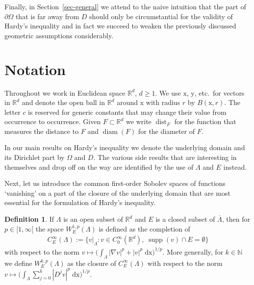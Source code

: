\documentclass[10pt,leqno]{amsart}
\theoremstyle{definition}
\newtheorem{definition}[theorem]{Definition}
\numberwithin{equation}{section}
\begin{document}
Finally, in Section~\ref{sec-general} we attend to the naive intuition that
the part of $\partial \Omega$ that is far away from $D$ should only be
circumstantial for the validity of Hardy's inequality and in fact we succeed to
weaken the previously discussed geometric assumptions considerably.

\section{Notation}
\noindent Throughout we work in Euclidean space ${{\mathbb R}}^d$, $d \geq 1$. We use
${{\mathrm x}}$, ${{\mathrm y}}$, etc.\ for vectors in ${{\mathbb R}}^d$ and denote the open ball in ${{\mathbb R}}^d$
around ${{\mathrm x}}$ with radius $r$ by $B({{\mathrm x}}, r)$. The letter $c$ is reserved for
generic constants that may change their value from occurrence to
occurrence. Given $F \subset {{\mathbb R}}^d$ we write ${\operatorname{dist}}_F$ for the function that
measures the distance to $F$ and ${\operatorname{diam}}(F)$ for the diameter of $F$.

In our main results on Hardy's inequality we denote the underlying domain and
its Dirichlet part by $\Omega$ and $D$. The various side results that are
interesting in themselves and drop off on the way are identified by the use of
$\Lambda$ and $E$ instead.

Next, let us introduce the common first-order Sobolev spaces of functions
`vanishing' on a part of the closure of the underlying domain that are most
essential for the formulation of Hardy's inequality. 

\begin{definition}\label{d-WkpD}
If $\Lambda$ is an open subset of ${{\mathbb R}}^d$ and $E$ is a closed subset of
$\overline \Lambda$, then for $p \in {[1,\infty[}$ the space
$W^{1,p}_E(\Lambda)$ is defined as the completion of
 \begin{align*}
   C^\infty_E(\Lambda) := \{ v|_\Lambda : v \in C_0^\infty({{\mathbb R}}^d),
	\; {\operatorname{supp}}(v) \cap E = \emptyset \}
 \end{align*}
with respect to the norm $v \mapsto \bigl( \int_\Lambda |\nabla v|^p +
|v|^p \; {{\mathrm d}} {{\mathrm x}} \bigr)^{1/p}$. More generally, for $k \in {{\mathbb N}}$ we define
$W^{k,p}_E(\Lambda)$ as the closure of $C^\infty_E(\Lambda)$ with respect to
the norm $v \mapsto \bigl( \int_\Lambda \sum_{j=0}^k |D^j v|^p \; {{\mathrm d}} {{\mathrm x}}
\bigr)^{1/p}$. 
\end{definition}
\end{document}
